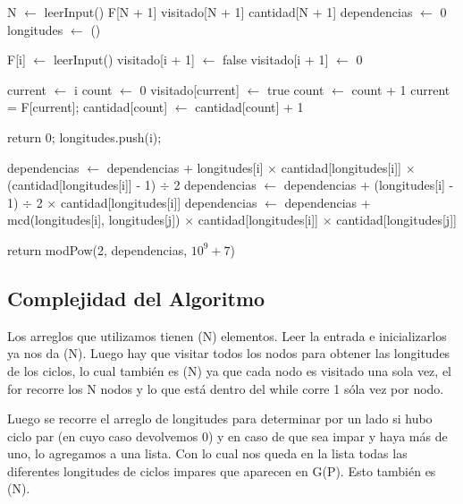 	\begin{algorithmic}
		\State N $\gets$ leerInput()
		\State F[N + 1]
		\State visitado[N + 1]
		\State cantidad[N + 1]
		\State dependencias $\gets$ 0
		\State longitudes $\gets$ ()

			\State F[i] $\gets$ leerInput()
			\State visitado[i + 1] $\gets$ false
			\State visitado[i + 1] $\gets$ 0
		\EndFor

			\State current $\gets$ i
			\State count $\gets$ 0
				\State visitado[current] $\gets$ true
				\State count $\gets$ count + 1
				\State current = F[current];
			\EndWhile
			\State cantidad[count] $\gets$ cantidad[count] + 1
		\EndFor

				\State return 0;
			\EndIf
				\State longitudes.push(i);
			\EndIf
		\EndFor

			\State dependencias $\gets$ dependencias + longitudes[i] $\times $ cantidad[longitudes[i]] $\times$ (cantidad[longitudes[i]] - 1) $\div$ 2 
			\State dependencias $\gets$ dependencias + (longitudes[i] - 1) $\div$ 2 $\times$ cantidad[longitudes[i]] 
				\State dependencias $\gets$ dependencias + mcd(longitudes[i], longitudes[j]) $\times$ cantidad[longitudes[i]] $\times$ cantidad[longitudes[j]]
			\EndFor
		\EndFor

		\State return modPow(2, dependencias, $10^9 + 7$)

	\end{algorithmic}


\subsection{Complejidad del Algoritmo}	

	Los arreglos que utilizamos tienen \bigo(N) elementos. Leer la entrada e inicializarlos ya nos da \bigo(N). Luego hay que visitar todos los nodos para obtener las longitudes de los ciclos, lo cual también es \bigo(N) ya que cada nodo es visitado una sola vez, el for recorre los N nodos y lo que está dentro del while corre 1 sóla vez por nodo. \newline

	Luego se recorre el arreglo de longitudes para determinar por un lado si hubo ciclo par (en cuyo caso devolvemos 0) y en caso de que sea impar y haya más de uno, lo agregamos a una lista. Con lo cual nos queda en la lista todas las diferentes longitudes de ciclos impares que aparecen en G(P). Esto también es \bigo(N). \newline

